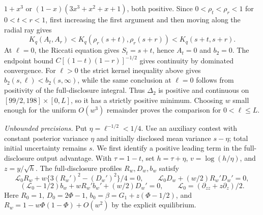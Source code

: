 \documentclass[mnsc]{informs3}
\begin{document}
\begin{APPENDICES}
{$1+x^3$ or $(1-x)(3x^3+x^2+x+1)$, both positive.
Since $0<\rho_t<\rho_r<1$ for $0<t<r<1$, first increasing the
first argument and then moving along the radial ray gives
\[
K_q(A_t,A_r)
<K_q\!\left(\rho_r(s+t),\rho_r(s+r)\right)
<K_q(s+t,s+r).
\]
At $\ell=0$, the Riccati equation gives $S_t=s+t$, hence $A_t=0$ and
$b_2=0$. The endpoint bound
$C[(1-t)(1-r)]^{-1/2}$ gives continuity by dominated convergence.
For $\ell>0$ the strict kernel inequality above gives
$b_2(s,\ell)<b_2(s,\infty)$, while the same conclusion at $\ell=0$
follows from positivity of the full-disclosure integral. Thus
$\Delta_2$ is positive and continuous on
$[99/2,198]\times[0,L]$, so it has a strictly positive minimum. Choosing
$w$ small enough for the uniform $O(w^3)$ remainder proves the comparison
for $0<\ell\leq L$.

\emph{Unbounded precisions.}
Put $\eta=\ell^{-1/2}<1/4$.
Use an auxiliary contest with constant posterior variance $\eta$
and initially disclosed mean variance $s-\eta$; total initial
uncertainty remains $s$. We first identify a positive leading term
in the full-disclosure output advantage. With $\tau=1-t$, set
$h=\tau+\eta$, $v=\log(h/\eta)$, and $z=y/\sqrt h$.
The full-disclosure profiles $R_w,D_w,b_w$ satisfy
\[
\mathcal L_0R_w+w\{3(R_w')^2-(D_w')^2\}/4=0,\qquad
\mathcal L_0D_w+(w/2)R_w'D_w'=0,
\]
\[
(\mathcal L_0-1/2)b_w+wR_w'b_w'+(w/2)D_w'=0,
\qquad \mathcal L_0=(\partial_{zz}+z\partial_z)/2.
\]
Here $R_0=1$, $D_0=2\Phi-1$, $b_0=\beta=G_1+z(\Phi-1/2)$,
and $R_w=1-w\Phi(1-\Phi)+O(w^2)$ by the explicit equilibrium.

}
\end{APPENDICES}
\end{document}
